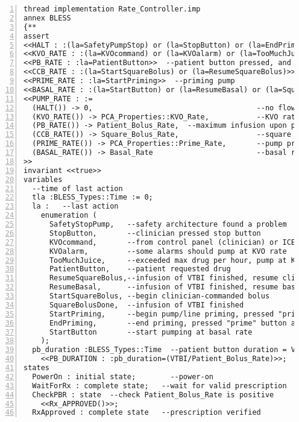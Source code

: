 \begin{lstlisting}[language=aadl, gobble=0, numbers=left, caption={\lstinline{Rate_Controller} thread}, label={listing:aadl:rate_controller_thread}]
thread implementation Rate_Controller.imp
annex BLESS
{**
assert
<<HALT : :(la=SafetyPumpStop) or (la=StopButton) or (la=EndPriming)>>  --pump at 0 if stop button, or safety architecture says, or done priming
<<KVO_RATE : :(la=KVOcommand) or (la=KVOalarm) or (la=TooMuchJuice)>>  --pump at KVO rate when commanded, some alarms, or excedded hourly limit
<<PB_RATE : :la=PatientButton>>  --patient button pressed, and allowed
<<CCB_RATE : :(la=StartSquareBolus) or (la=ResumeSquareBolus)>>  --clinician-commanded bolus start or resumption after patient bolus
<<PRIME_RATE : :la=StartPriming>>  --priming pump
<<BASAL_RATE : :(la=StartButton) or (la=ResumeBasal) or (la=SquareBolusDone)>>  --regular infusion
<<PUMP_RATE : :=
  (HALT()) -> 0,                                      --no flow
  (KVO_RATE()) -> PCA_Properties::KVO_Rate,           --KVO rate
  (PB_RATE()) -> Patient_Bolus_Rate,  --maximum infusion upon patient request
  (CCB_RATE()) -> Square_Bolus_Rate,                  --square bolus rate=VTBI/duration, from data port
  (PRIME_RATE()) -> PCA_Properties::Prime_Rate,       --pump priming
  (BASAL_RATE()) -> Basal_Rate                        --basal rate, from data port
>>
invariant <<true>>
variables
  --time of last action
  tla :BLESS_Types::Time := 0;
  la :   --last action
    enumeration ( 
      SafetyStopPump,   --safety architecture found a problem
      StopButton,       --clinician pressed stop button
      KVOcommand,       --from control panel (clinician) or ICE (app) to pump Keep-vein-open rate
      KVOalarm,         --some alarms should pump at KVO rate
      TooMuchJuice,     --exceeded max drug per hour, pump at KVO until prescription and patient are re-authenticated
      PatientButton,    --patient requested drug
      ResumeSquareBolus,--infusion of VTBI finished, resume clinician-commanded bolus
      ResumeBasal,      --infusion of VTBI finished, resume basal-rate
      StartSquareBolus, --begin clinician-commanded bolus
      SquareBolusDone,  --infusion of VTBI finished
      StartPriming,     --begin pump/line priming, pressed "prime" button
      EndPriming,       --end priming, pressed "prime" button again, or time-out 
      StartButton       --start pumping at basal rate
    );    
  pb_duration :BLESS_Types::Time  --patient button duration = VTBI/Patient_Bolus_Rate
    <<PB_DURATION : :pb_duration=(VTBI/Patient_Bolus_Rate)>>;
states
  PowerOn : initial state;        --power-on
  WaitForRx : complete state;   --wait for valid prescription
  CheckPBR : state  --check Patient_Bolus_Rate is positive
    <<Rx_APPROVED()>>;
  RxApproved : complete state   --prescription verified

\end{lstlisting}
